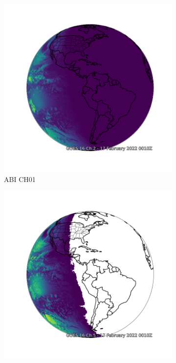 \begin{figure}[h!]
  \centering
  \begin{subfigure}[a]{0.4\linewidth}
    \includegraphics[width=\linewidth]{goes_fulldisk_C01.png}
     \caption{ABI CH01}
  \end{subfigure}
  \begin{subfigure}[b]{0.4\linewidth}
    \includegraphics[width=\linewidth]{goes_fulldisk_C05.png}

\end{subfigure}
\end{figure}
